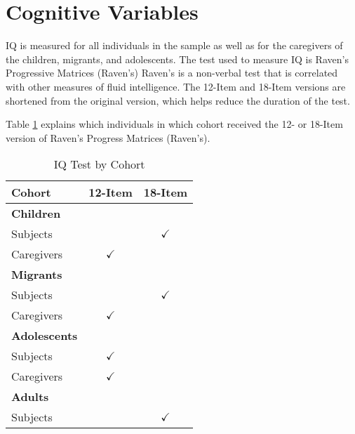 \section{Cognitive Variables}
\label{sec:cog}

IQ is measured for all individuals in the sample as well as for the caregivers of the children, migrants, and adolescents. The test used to measure IQ is Raven's Progressive Matrices (Raven's)
Raven's is a non-verbal test that is correlated with other measures of fluid intelligence. The 12-Item and 18-Item versions are shortened from the original version, which helps reduce the duration of the test.

 Table \ref{tab:test-type} explains which individuals in which cohort received the 12- or 18-Item version of Raven's Progress Matrices (Raven's).

\begin{table}[htbp]
	\centering
	\caption{IQ Test by Cohort}\label{tab:test-type}
	\begin{tabular}{lcc}
		\toprule
		Cohort & 12-Item & 18-Item \\
		\midrule
		\textbf{Children} & &\\
		\quad Subjects & & $\checkmark$  \\
		\quad Caregivers &  $\checkmark$ & \\
		\textbf{Migrants} & & \\
		\quad Subjects & & $\checkmark$ \\
		\quad Caregivers & $\checkmark$ &  \\
		\textbf{Adolescents} & & \\
		\quad Subjects & $\checkmark$ & \\
		\quad Caregivers &  $\checkmark$ &  \\
		\textbf{Adults} & & \\
		\quad Subjects & & $\checkmark$ \\
		\bottomrule
	\end{tabular}
\end{table}